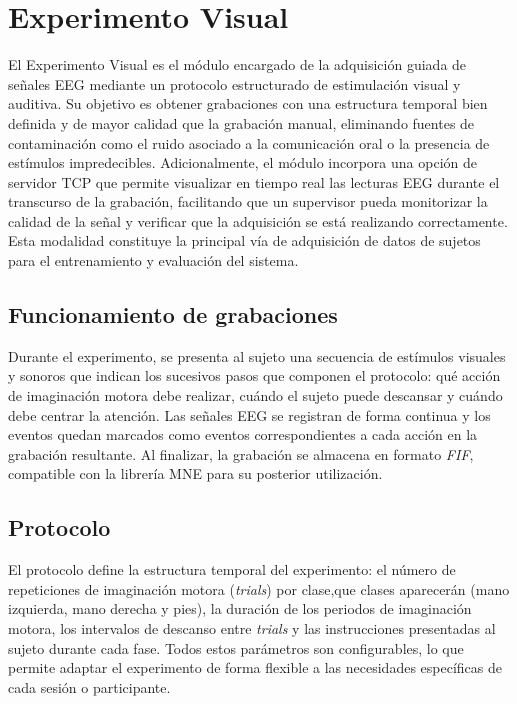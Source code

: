 \section{Experimento Visual}
\label{sec:experimentoVisual}

El Experimento Visual es el módulo encargado de la adquisición guiada de señales EEG mediante un protocolo estructurado de estimulación visual y auditiva. Su objetivo es obtener grabaciones con una estructura temporal bien definida y de mayor calidad que la grabación manual, eliminando fuentes de contaminación como el ruido asociado a la comunicación oral o la presencia de estímulos impredecibles. Adicionalmente, el módulo incorpora una opción de servidor TCP que permite visualizar en tiempo real las lecturas EEG durante el transcurso de la grabación, facilitando que un supervisor pueda monitorizar la calidad de la señal y verificar que la adquisición se está realizando correctamente. Esta modalidad constituye la principal vía de adquisición de datos de sujetos para el entrenamiento y evaluación del sistema.

\subsection{Funcionamiento de grabaciones}
\label{subsec:funcionamientoGrabaciones}

Durante el experimento, se presenta al sujeto una secuencia de estímulos visuales y sonoros que indican los sucesivos pasos que componen el protocolo: qué acción de imaginación motora debe realizar, cuándo el sujeto puede descansar y cuándo debe centrar la atención. Las señales EEG se registran de forma continua y los eventos quedan marcados como eventos correspondientes a cada acción en la grabación resultante. Al finalizar, la grabación se almacena en formato \textit{FIF}, compatible con la librería MNE para su posterior utilización.

\subsection{Protocolo}
\label{subsec:protocoloExperimento}

El protocolo define la estructura temporal del experimento: el número de repeticiones de imaginación motora (\textit{trials}) por clase,que clases aparecerán (mano izquierda, mano derecha y pies), la duración de los periodos de imaginación motora, los intervalos de descanso entre \textit{trials} y las instrucciones presentadas al sujeto durante cada fase. Todos estos parámetros son configurables, lo que permite adaptar el experimento de forma flexible a las necesidades específicas de cada sesión o participante.

